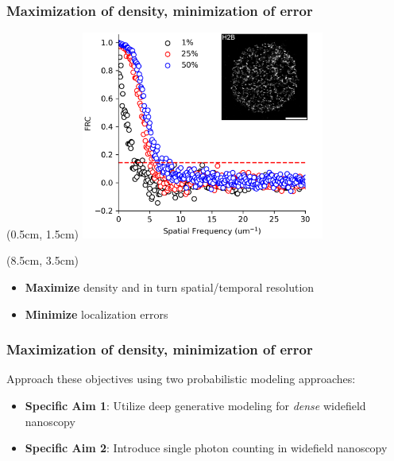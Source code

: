 \documentclass{beamer}					%
\begin{document}

\begin{frame}
\frametitle{Maximization of density, minimization of error}

\begin{textblock*}{8cm}(0.5cm, 1.5cm)
\includegraphics[width=8cm]{../../dissertation/dissertation/media/FRC.png}
\end{textblock*}

\begin{textblock*}{5cm}(8.5cm, 3.5cm)
\begin{itemize}
\item \textbf{Maximize} density and in turn spatial/temporal resolution
\item \textbf{Minimize} localization errors 
\end{itemize}
\end{textblock*}

\end{frame}

\begin{frame}
\frametitle{Maximization of density, minimization of error}

Approach these objectives using two probabilistic modeling approaches:
\begin{itemize}
\item \textbf{Specific Aim 1}: Utilize deep generative modeling for \emph{dense} widefield nanoscopy
\item \textbf{Specific Aim 2}: Introduce single photon counting in widefield nanoscopy
\end{itemize}

\end{frame}
\end{document}
